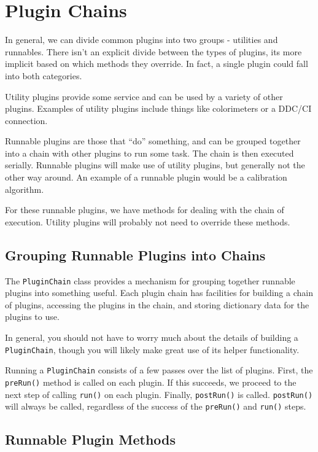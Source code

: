 
\section{Plugin Chains}
\label{sec:Plugin Chains}

In general, 
we can divide common plugins into two groups - utilities and runnables.
There isn't an explicit divide between the types of plugins, its
more implicit based on which methods they override. In fact, a single
plugin could fall into both categories.

Utility plugins provide some service and can be used by a variety
of other plugins. Examples of utility plugins include things like
colorimeters or a DDC/CI connection. 

Runnable plugins are those that ``do'' something, and can be grouped
together into a chain with other plugins to run some task. The chain
is then executed serially. Runnable plugins will make use of utility
plugins, but generally not the other way around. An example of a 
runnable plugin would be a calibration algorithm.

For these runnable plugins, we have methods for dealing with the chain
of execution. Utility plugins will probably not need to override these
methods.

\subsection{Grouping Runnable Plugins into Chains}

The {\tt PluginChain} class provides a mechanism for grouping together
runnable plugins into something useful. Each plugin chain has facilities
for building a chain of plugins, accessing the plugins in the chain, 
and storing dictionary data for the plugins to use.

In general, you should not have to worry much about the details of
building a {\tt PluginChain}, though you will likely make great use
of its helper functionality. 

Running a {\tt PluginChain} consists of a few passes over the list of
plugins. First, the {\tt preRun()} method is called on each plugin.
If this succeeds, we proceed to the next step of calling {\tt run()}
on each plugin. Finally, {\tt postRun()} is called. {\tt postRun()}
will always be called, regardless of the success of the {\tt preRun()} 
and {\tt run()} steps.

\subsection{Runnable Plugin Methods}

